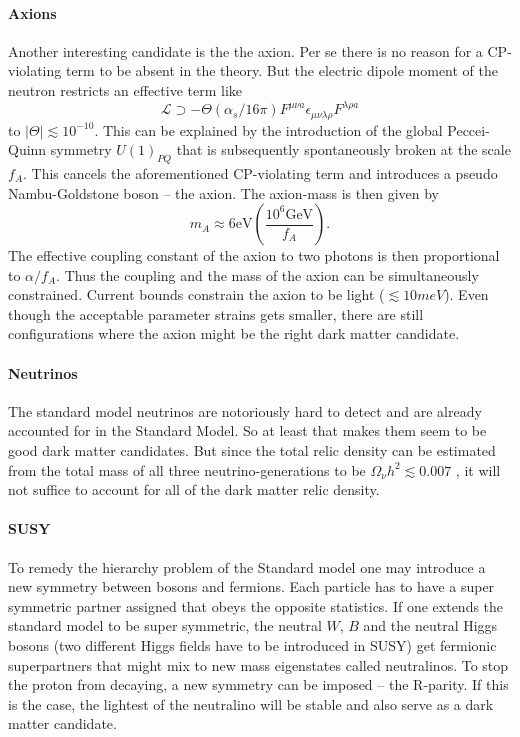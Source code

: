 \paragraph{Axions}
Another interesting candidate is the the axion. 
Per se there is no reason for a CP-violating term to be absent in the theory. But the electric dipole moment of the neutron restricts \cite{Patrignani:2016xqp} an effective term like 
\begin{equation}
\mathcal{L}\supset -\Theta (\alpha_s/16\pi)F^{\mu\nu a}\epsilon_{\mu\nu\lambda\rho}F^{\lambda\rho a}
\end{equation}
to $|\Theta|\lesssim10^{-10}$. This can be explained by the introduction of the global Peccei-Quinn symmetry $U(1)_{PQ}$ that is subsequently spontaneously broken at the scale $f_A$. This cancels the aforementioned CP-violating term and introduces a pseudo Nambu-Goldstone boson -- the axion.
The axion-mass is then given by\cite{Bergstrom:2000pn}
\begin{equation}
m_A\approx 6\text{eV}\left(\frac{10^6\text{GeV}}{f_A}\right).
\end{equation}
The effective coupling constant of the axion to two photons is then proportional to $\alpha/f_A$. Thus the coupling and the mass of the axion can be simultaneously constrained.
Current bounds constrain the axion to be light ($\lesssim 10meV$). Even though the acceptable parameter strains gets smaller, there are still configurations where the axion might be the right dark matter candidate.

\paragraph{Neutrinos}
The standard model neutrinos are notoriously hard to detect and are already accounted for in the Standard Model. So at least that makes them seem to be good dark matter candidates. But since the total relic density can be estimated from the total mass of all three neutrino-generations to be $\Omega_\nu h^2 \lesssim 0.007$ , it will not suffice to account for all of the dark matter relic density.

\paragraph{SUSY}
To remedy the hierarchy problem of the Standard model one may introduce a new symmetry between bosons and fermions. Each particle has to have a super symmetric partner assigned that obeys the opposite statistics. If one extends the standard model to be super symmetric, the neutral $W$, $B$ and the neutral Higgs bosons (two different Higgs fields have to be introduced in SUSY) get fermionic superpartners that might mix to new mass eigenstates called neutralinos. To stop the proton from decaying, a new symmetry can be imposed -- the R-parity. If this is the case, the lightest of the neutralino will be stable and also serve as a dark matter candidate.

